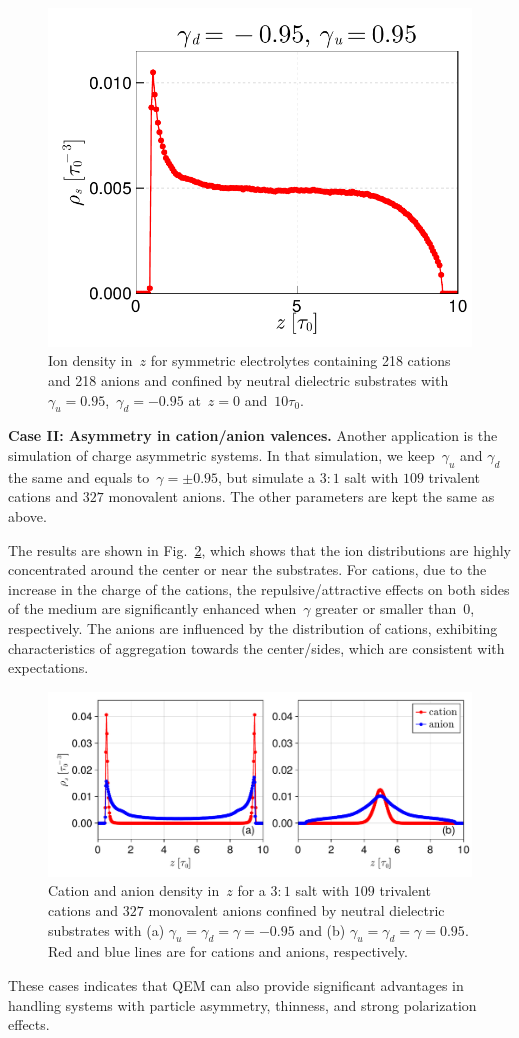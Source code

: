 \begin{figure}[htb]
    \centering
    \includegraphics[width = 0.625\linewidth]{figs/non_symm.pdf}
    \caption{
        Ion density in~$z$ for symmetric electrolytes containing 218 cations and 218 anions and confined by neutral dielectric substrates with $\gamma_u = 0.95$,~$\gamma_d = -0.95$ at~$z = 0$ and~$10\tau_0$.
    }
    \label{fig:non_sym}
\end{figure}

\textbf{Case II: Asymmetry in cation/anion valences.}
Another application is the simulation of charge asymmetric systems.
In that simulation, we keep~$\gamma_u$ and $\gamma_d$ the same and equals to~$\gamma = \pm 0.95$, but simulate a $3:1$ salt with $109$ trivalent cations and $327$ monovalent anions. 
The other parameters are kept the same as above.

The results are shown in Fig.~\ref{fig:salt3-1}, which shows that the ion distributions are highly concentrated around the center or near the substrates.
For cations, due to the increase in the charge of the cations, the repulsive/attractive effects on both sides of the medium are significantly enhanced when~$\gamma$ greater or smaller than~$0$, respectively.
The anions are influenced by the distribution of cations, exhibiting characteristics of aggregation towards the center/sides, which are consistent with expectations.

\begin{figure}[htb]
  \centering
  \includegraphics[width = \linewidth]{figs/density_3-1.pdf}

  \caption{
    Cation and anion density in~$z$ for a $3:1$ salt with $109$ trivalent cations and $327$ monovalent anions confined by neutral dielectric substrates with (a) $\gamma_u = \gamma_d = \gamma = - 0.95$ and (b) $\gamma_u = \gamma_d = \gamma = 0.95$.
    Red and blue lines are for cations and anions, respectively.
  }
    \label{fig:salt3-1}
\end{figure}

These cases indicates that QEM can also provide significant advantages in handling systems with particle asymmetry, thinness, and strong polarization effects.
